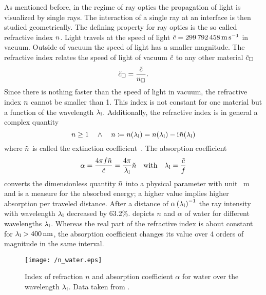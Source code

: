 As mentioned before, in the regime of ray optics the propagation of light is 
visualized by single rays. The interaction of a single ray at an interface is 
then studied geometrically. The defining property for ray optics is the so 
called refractive index $n$. Light travels at the speed of light 
$\tilde{\speed}=\SI{299792458}{\m\per\s}$ in vacuum. Outside of vacuum the 
speed of light has a smaller magnitude. The refractive index relates the speed 
of light of vacuum $\tilde{c}$ to any other material 
$\tilde{c}_{\Box}$
\begin{equation}
  \tilde{c}_{\Box} = \frac{\tilde{c}}{n_{\Box}}.
  \label{eq:TO-lightspeed}
\end{equation}
Since there is nothing faster than the speed of light in vacuum, the refractive 
index $n$ cannot be smaller than 1. This index is not constant for 
one material but a function of the wavelength $\lambda_{\mathrm{l}}$. Additionally, the 
refractive index is in general a complex quantity
\begin{equation}
  n\geq 1 \quad \wedge \quad n \coloneqq 
  n(\lambda_{\mathrm{l}}) = n(\lambda_{\mathrm{l}}) - \mathrm{i}\mkern1mu \tilde{n}(\lambda_{\mathrm{l}})
  \label{eq:TO-refractive-index}
\end{equation}
where $\tilde{n}$ is called the extinction 
coefficient~\cite{Jackson2013}. The absorption coefficient~\cite{Hecht2017}
\begin{equation}
  \alpha = \frac{4\pi f \tilde{n}}{\tilde{c}} = 
  \frac{4\pi}{\lambda_{\mathrm{l}}}\tilde{n}\quad\text{with}\quad\lambda_{\mathrm{l}}=\frac{\tilde{c}}{f}
  \label{eq:TO-alpha}
\end{equation}
converts the dimensionless quantity $\tilde{n}$ into a physical 
parameter with unit \si{\per\meter} and is a measure for the absorbed energy; a 
higher value implies higher absorption per traveled distance. After a distance 
of $\alpha\left(\lambda_{\mathrm{l}}\right)^{-1}$ the ray intensity with wavelength $\lambda_{\mathrm{l}}$ 
decreased by 63.2\%.  depicts $n$ and $\alpha$ of water 
for different wavelengths $\lambda_{\mathrm{l}}$. Whereas the real part of the refractive index 
is about constant for $\lal > \SI{400}{\nm}$, the absorption coefficient 
changes its value over 4 orders of magnitude in the same interval.

\begin{figure}[tbp]
  \centering
  \texttt{[image: /n\_water.eps]}
  \caption{Index of refraction $n$ and absorption coefficient $\alpha$ for 
  water over the wavelength $\lambda_{\mathrm{l}}$. Data taken from 
\cite{Hale1973,Segelstein1981}.}
  \label{fig:TO-n_water}
\end{figure}


